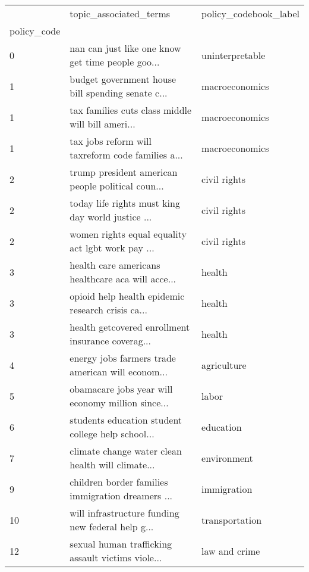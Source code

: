 \begin{tabular}{lll}
\toprule
{} &                             topic\_associated\_terms &  policy\_codebook\_label \\
policy\_code &                                                    &                        \\
\midrule
0           &  nan can just like one know get time people goo... &        uninterpretable \\
1           &  budget government house bill spending senate c... &         macroeconomics \\
1           &  tax families cuts class middle will bill ameri... &         macroeconomics \\
1           &  tax jobs reform will taxreform code families a... &         macroeconomics \\
2           &  trump president american people political coun... &           civil rights \\
2           &  today life rights must king day world justice ... &           civil rights \\
2           &  women rights equal equality act lgbt work pay ... &           civil rights \\
3           &  health care americans healthcare aca will acce... &                 health \\
3           &  opioid help health epidemic research crisis ca... &                 health \\
3           &  health getcovered enrollment insurance coverag... &                 health \\
4           &  energy jobs farmers trade american will econom... &            agriculture \\
5           &  obamacare jobs year will economy million since... &                  labor \\
6           &  students education student college help school... &              education \\
7           &  climate change water clean health will climate... &            environment \\
9           &  children border families immigration dreamers ... &            immigration \\
10          &  will infrastructure funding new federal help g... &         transportation \\
12          &  sexual human trafficking assault victims viole... &          law and crime \\

\end{tabular}
